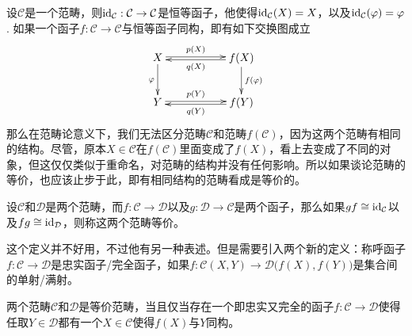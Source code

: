 \para[范畴的等价] 设$\mathcal{C}$是一个范畴，则$\operatorname{id}_\mathcal{C}:\mathcal{C}\to \mathcal{C}$是恒等函子，他使得$\operatorname{id}_\mathcal{C}(X)=X$，以及$\operatorname{id}_\mathcal{C}(\varphi)=\varphi$. 如果一个函子$f:\mathcal{C}\to\mathcal{C}$与恒等函子同构，即有如下交换图成立
\[
\begin{xy}
	\xymatrix{
		X\ar@<0.3ex>[rr]^-{p(X)} \ar[d]_{\varphi}&&f(X) \ar[d]^{f(\varphi)}\ar@<0.3ex>[ll]^-{q(X)}\\
		Y\ar@<0.3ex>[rr]^-{p(Y)}&&f(Y)\ar@<0.3ex>[ll]^-{q(Y)}
	}
\end{xy}
\]
那么在范畴论意义下，我们无法区分范畴$\mathcal{C}$和范畴$f(\mathcal{C})$，因为这两个范畴有相同的结构。尽管，原本$X\in \mathcal{C}$在$f(\mathcal{C})$里面变成了$f(X)$，看上去变成了不同的对象，但这仅仅类似于重命名，对范畴的结构并没有任何影响。所以如果谈论范畴的等价，也应该止步于此，即有相同结构的范畴看成是等价的。

设$\mathcal{C}$和$\mathcal{D}$是两个范畴，而$f:\mathcal{C}\to \mathcal{D}$以及$g:\mathcal{D}\to \mathcal{C}$是两个函子，那么如果$gf\cong \operatorname{id}_\mathcal{C}$以及$fg\cong \operatorname{id}_\mathcal{D}$，则称这两个范畴等价。

这个定义并不好用，不过他有另一种表述。但是需要引入两个新的定义：称呼函子$f:\mathcal{C}\to \mathcal{D}$是忠实函子/完全函子，如果$f:\mathcal{C}(X,Y)\to \mathcal{D}\bigl(f(X),f(Y)\bigr)$是集合间的单射/满射。

\begin{pro}\label{equivcat}
两个范畴$\mathcal{C}$和$\mathcal{D}$是等价范畴，当且仅当存在一个即忠实又完全的函子$f:\mathcal{C}\to \mathcal{D}$使得任取$Y\in\mathcal{D}$都有一个$X\in \mathcal{C}$使得$f(X)$与$Y$同构。
\end{pro}

